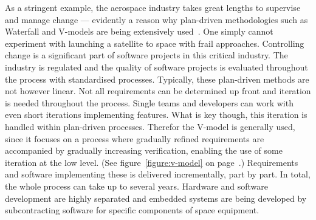 \documentclass[english]{tktltiki2}
\begin{document}
As a stringent example, the aerospace industry takes great lengths to supervise and manage change — evidently a reason why plan-driven methodologies such as Waterfall and V-models are being extensively used~\cite{Hol15b}. One simply cannot experiment with launching a satellite to space with frail approaches. Controlling change is a significant part of software projects in this critical industry. The industry is regulated and the quality of software projects is evaluated throughout the process with standardised processes. Typically, these plan-driven methods are not however linear. Not all requirements can be determined up front and iteration is needed throughout the process. Single teams and developers can work with even short iterations implementing features. What is key though, this iteration is handled within plan-driven processes. Therefor the V-model is generally used, since it focuses on a process where gradually refined requirements are accompanied by gradually increasing verification, enabling the use of some iteration at the low level. (See figure~\ref{figure:v-model} on page~\pageref{figure:v-model}.) Requirements and software implementing these is delivered incrementally, part by part. In total, the whole process can take up to several years. Hardware and software development are highly separated and embedded systems are being developed by subcontracting software for specific components of space equipment.
\end{document}

